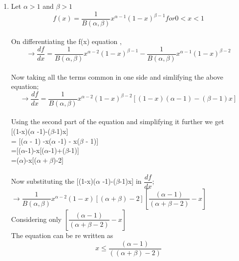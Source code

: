 \documentclass[letterpaper]{article}
\begin{document}
\begin{enumerate}
\begin{enumerate}
\item Let $\alpha > 1$ and $\beta > 1 $ \\
\begin{equation*}
f(x) = \dfrac{1}{B(\alpha , \beta)}x^{\alpha-1}(1-x)^{\beta -1} for 0<x<1
\end{equation*}\\
 
 On differentiating the f(x) equation ,\\
 \begin{equation*}
 \rightarrow \dfrac{df}{dx} =\dfrac{1}{ B(\alpha,\beta) } x^{\alpha-2}(1-x)^{\beta-1}-\dfrac{1}{ B(\alpha,\beta) } x^{\alpha-1}(1-x)^{\beta-2}
 \end{equation*}\\

  Now taking all the terms common in one side and simlifying the above equation;\\
  \begin{equation*}
\rightarrow \dfrac{df}{dx} =\dfrac{1}{B(\alpha,\beta)} x^{\alpha-2}(1-x)^{\beta-2} [(1-x)(\alpha -1 )-(\beta-1)x]
\end{equation*}\\


Using the second part of the equation and simplifying it further we get \\

[(1-x)($\alpha$ -1)-($\beta$-1)x]\\ = [($\alpha$ - 1) -x($\alpha$ -1) - x($\beta$ - 1)]\\
                        =[($\alpha$-1)-x[($\alpha$-1)+($\beta$-1)]\\
                          =($\alpha$)-x[($\alpha+\beta$)-2]\\\\

Now substituting the [(1-x)($\alpha$ -1)-($\beta$-1)x] in $\dfrac{df}{dx}$;   \\

$\rightarrow \dfrac{1}{B(\alpha,\beta)} x^{\alpha-2}(1-x) [(\alpha+\beta)-2] [\dfrac{(\alpha-1)}{(\alpha+\beta-2)}-x]$\\

Considering only $ [\dfrac{(\alpha-1)}{(\alpha+\beta-2)}-x]$\\

The equation can be re written as \\
\begin{equation*}
x \leq \dfrac{(\alpha-1)}{((\alpha+\beta)-2)}
\end{equation*}\\


\end{enumerate}
\end{enumerate}
\end{document}
